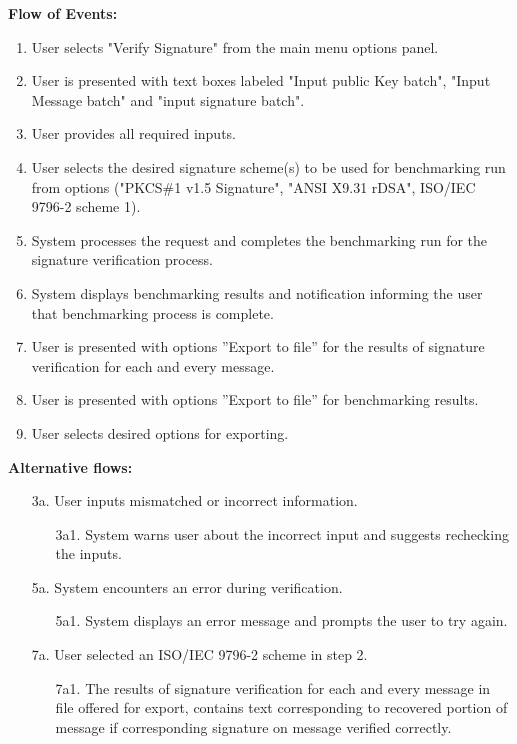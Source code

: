 \documentclass[]{final_report}
\theoremstyle{definition}
\begin{document}
\noindent\textbf{Flow of Events:}
\begin{enumerate}
    \item User selects "Verify Signature" from the main menu options panel.
    \item User is presented with text boxes labeled "Input public Key batch", "Input Message batch" and "input signature batch".
    \item User provides all required inputs.
       \item User selects the desired signature scheme(s) to be used for benchmarking run from options ("PKCS\#1 v1.5 Signature", "ANSI X9.31 rDSA", ISO\slash IEC 9796-2 scheme 1).
         \item System processes the request and completes the benchmarking run for the signature verification process.
      \item System displays benchmarking results and notification informing the user that benchmarking process is complete.
      \item User is presented with options ”Export to file” for the results of signature verification for each and every message.
       \item User is presented with options ”Export to file” for benchmarking results.
       \item User selects desired options for exporting.
\end{enumerate}

\noindent\textbf{Alternative flows:}
\begin{enumerate}
    \item[3a.] User inputs mismatched or incorrect information.
    \begin{enumerate}
        \item[3a1.] System warns user about the incorrect input and suggests rechecking the inputs.
    \end{enumerate}
    \item[5a.] System encounters an error during verification.
    \begin{enumerate}
        \item[5a1.] System displays an error message and prompts the user to try again.
    \end{enumerate}
    \item[7a.]  User selected an ISO\slash IEC 9796-2 scheme in step 2.
    \begin{enumerate}
        \item[7a1.] The results of signature verification for each and every message in file offered for export, contains text corresponding to recovered portion of message if corresponding signature on message verified correctly.
    \end{enumerate}
\end{enumerate}
\end{document}
